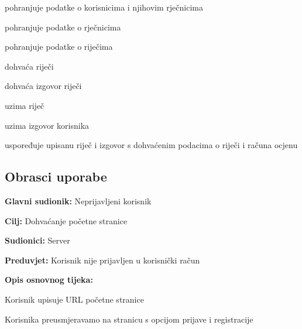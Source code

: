 \begin{packed_enum}
				\item {}
				\begin{packed_enum}
					\item pohranjuje podatke o korisnicima i njihovim rječnicima
					\item pohranjuje podatke o rječnicima
					\item pohranjuje podatke o riječima
				\end{packed_enum}
				
				\item {}
				\begin{packed_enum}
					\item dohvaća riječi
					\item dohvaća izgovor riječi
				\end{packed_enum}
				
				\item {}
				\begin{packed_enum}
					\item uzima riječ
					\item uzima izgovor korisnika
					\item uspoređuje upisanu riječ i izgovor s dohvaćenim podacima o riječi i računa ocjenu
				\end{packed_enum}
				
			\end{packed_enum}
			
			\eject 
			
			
				
			\subsection{Obrasci uporabe}

					\noindent {}
					\begin{packed_item}
						\item \textbf{Glavni sudionik:} Neprijavljeni korisnik
						\item \textbf{Cilj:} Dohvaćanje početne stranice
						\item \textbf{Sudionici:} Server
						\item \textbf{Preduvjet:} Korisnik nije prijavljen u korisnički račun
						\item \textbf{Opis osnovnog tijeka:}
						\begin{packed_enum}
							\item Korisnik upisuje URL početne stranice
							\item Korisnika preusmjeravamo na stranicu s opcijom prijave i registracije
						\end{packed_enum}
					\end{packed_item}

